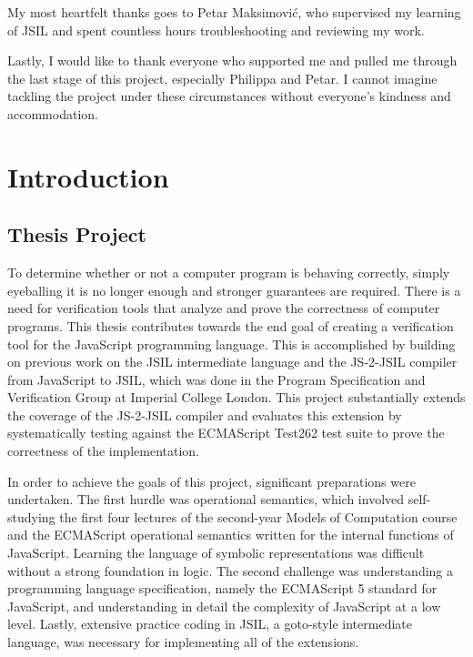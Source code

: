 \documentclass[a4paper,11pt,twoside]{report}
\begin{document}
\smallskip
My most heartfelt thanks goes to Petar Maksimovi\'c, who supervised my learning of JSIL and spent countless hours troubleshooting and reviewing my work.

\smallskip
Lastly, I would like to thank everyone who supported me and pulled me through the last stage of this project, especially Philippa and Petar. I cannot imagine tackling the project under these circumstances without everyone's kindness and accommodation.

\clearpage{\pagestyle{empty}\cleardoublepage}

\tableofcontents 


\clearpage{\pagestyle{empty}\cleardoublepage}
\setcounter{page}{1}
\fancyhead[LE,RO]{\slshape \rightmark}
\fancyhead[LO,RE]{\slshape \leftmark}

\chapter{Introduction}
\label{cha:intro}

\section{Thesis Project}
To determine whether or not a computer program is behaving correctly, simply eyeballing it is no longer enough and stronger guarantees are required. There is a need for verification tools that analyze and prove the correctness of computer programs. This thesis contributes towards the end goal of creating a verification tool for the JavaScript programming language. This is accomplished by building on previous work on the JSIL intermediate language and the JS-2-JSIL compiler from JavaScript to JSIL, which was done in the Program Specification and Verification Group at Imperial College London. This project substantially extends the coverage of the JS-2-JSIL compiler and evaluates this extension by systematically testing against the ECMAScript Test262 test suite to prove the correctness of the implementation.

In order to achieve the goals of this project, significant preparations were undertaken. The first hurdle was operational semantics, which involved self-studying the first four lectures of the second-year Models of Computation course and the ECMAScript operational semantics written for the internal functions of JavaScript. Learning the language of symbolic representations was difficult without a strong foundation in logic. The second challenge was understanding a programming language specification, namely the ECMAScript 5 standard for JavaScript, and understanding in detail the complexity of JavaScript at a low level. Lastly, extensive practice coding in JSIL, a goto-style intermediate language, was necessary for implementing all of the extensions.
\end{document}
